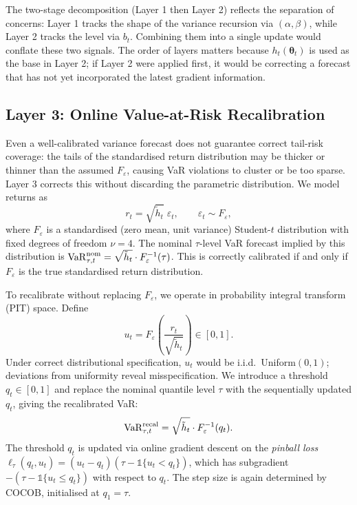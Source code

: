 The two-stage decomposition (Layer 1 then Layer 2) reflects the separation of concerns: Layer 1 tracks the shape of the variance recursion via $(\alpha, \beta)$, while Layer 2 tracks the level via $b_t$. Combining them into a single update would conflate these two signals. The order of layers matters because $h_t(\boldsymbol{\theta}_t)$ is used as the base in Layer 2; if Layer 2 were applied first, it would be correcting a forecast that has not yet incorporated the latest gradient information.

\subsection{Layer 3: Online Value-at-Risk Recalibration}\label{sec:layer3}

Even a well-calibrated variance forecast does not guarantee correct tail-risk coverage: the tails of the standardised return distribution may be thicker or thinner than the assumed $F_\varepsilon$, causing VaR violations to cluster or be too sparse. Layer 3 corrects this without discarding the parametric distribution. We model returns as
\[
    r_t = \sqrt{\tilde{h}_t}\;\varepsilon_t, \qquad \varepsilon_t \sim F_\varepsilon,
\]
where $F_\varepsilon$ is a standardised (zero mean, unit variance) Student-$t$ distribution with fixed degrees of freedom $\nu = 4$. The nominal $\tau$-level VaR forecast implied by this distribution is $\mathrm{VaR}_{\tau,t}^{\mathrm{nom}} = \sqrt{\tilde{h}_t} \cdot F_\varepsilon^{-1}(\tau)$. This is correctly calibrated if and only if $F_\varepsilon$ is the true standardised return distribution.

To recalibrate without replacing $F_\varepsilon$, we operate in probability integral transform (PIT) space. Define
\begin{equation}\label{eq:pit}
    u_t = F_\varepsilon\!\left(\frac{r_t}{\sqrt{\tilde{h}_t}}\right) \in [0,1].
\end{equation}
Under correct distributional specification, $u_t$ would be i.i.d.\ Uniform$(0,1)$; deviations from uniformity reveal misspecification. We introduce a threshold $q_t \in [0,1]$ and replace the nominal quantile level $\tau$ with the sequentially updated $q_t$, giving the recalibrated VaR:
\begin{equation}\label{eq:var_recal}
    \mathrm{VaR}_{\tau,t}^{\mathrm{recal}} = \sqrt{\tilde{h}_t}\cdot F_\varepsilon^{-1}(q_t).
\end{equation}
The threshold $q_t$ is updated via online gradient descent on the \emph{pinball loss} $\ell_\tau(q_t, u_t) = (u_t - q_t)(\tau - \mathds{1}\{u_t < q_t\})$, which has subgradient $-(\tau - \mathds{1}\{u_t \leq q_t\})$ with respect to $q_t$. The step size is again determined by COCOB, initialised at $q_1 = \tau$.

